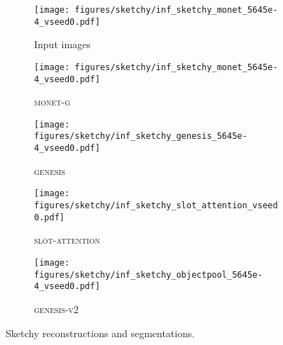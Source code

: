\documentclass{article}
\begin{document}
\begin{figure}[h!]
	\centering
	\begin{subfigure}{\linewidth}
	    \texttt{[image: figures/sketchy/inf\_sketchy\_monet\_5645e-4\_vseed0.pdf]}
	    \caption{Input images}
	    \vspace{6pt}
	\end{subfigure}
	\begin{subfigure}{\linewidth}
	    \texttt{[image: figures/sketchy/inf\_sketchy\_monet\_5645e-4\_vseed0.pdf]}
	    \caption{\textsc{monet-g}}
	    \vspace{6pt}
	\end{subfigure}
	\begin{subfigure}{\linewidth}
	    \texttt{[image: figures/sketchy/inf\_sketchy\_genesis\_5645e-4\_vseed0.pdf]}
	    \caption{\textsc{genesis}}
	    \vspace{6pt}
	\end{subfigure}
	\begin{subfigure}{\linewidth}
	    \texttt{[image: figures/sketchy/inf\_sketchy\_slot\_attention\_vseed0.pdf]}
	    \caption{\textsc{slot-attention}}
	    \vspace{6pt}
	\end{subfigure}
	\begin{subfigure}{\linewidth}
\texttt{[image: figures/sketchy/inf\_sketchy\_objectpool\_5645e-4\_vseed0.pdf]}
	    \caption{\textsc{genesis-v2}}
	\end{subfigure}
	\caption{Sketchy reconstructions and segmentations.}
\end{figure}
\end{document}
